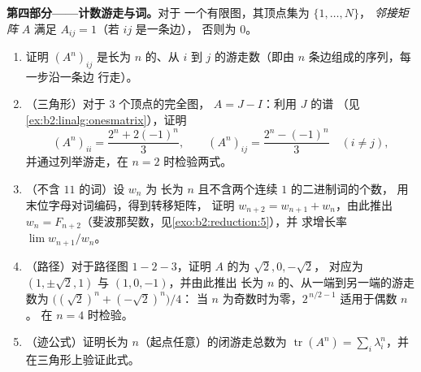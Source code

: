\begin{problem}
\medskip
\noindent\textbf{第四部分——计数游走与词。}对于
一个有限图，其顶点集为 $\{1, \dots, N\}$，
\emph{邻接矩阵} $A$ 满足 $A_{ij} = 1$（若 $ij$ 是一条边），
否则为 $0$。
\begin{enumerate}[resume]
  \item 证明 $(A^n)_{ij}$ 是长为
        $n$ 的、从 $i$ 到 $j$ 的游走数（即由 $n$ 条边组成的序列，每一步沿一条边
        行走）。
  \item （三角形）对于 $3$ 个顶点的完全图，
        $A = J - I$：利用 $J$ 的谱
        （见\cref{ex:b2:linalg:onesmatrix}），证明
        \[
        (A^n)_{ii} = \frac{2^n + 2(-1)^n}{3},
        \qquad
        (A^n)_{ij} = \frac{2^n - (-1)^n}{3} \quad (i \neq j),
        \]
        并通过列举游走，在 $n = 2$ 时检验两式。
  \item （不含 $11$ 的词）设 $w_n$ 为
        长为 $n$ 且不含两个连续 $1$ 的二进制词的个数，
        用末位字母对词编码，得到转移矩阵，
        证明 $w_{n+2} = w_{n+1} + w_n$，由此推出 $w_n =
        F_{n+2}$（斐波那契数，见\cref{exo:b2:reduction:5}），并
        求增长率 $\lim w_{n+1}/w_n$。
  \item （路径）对于路径图 $1 - 2 - 3$，证明
        $A$ 的为 $\sqrt2, 0, -\sqrt2$，
        对应为 $(1, \pm\sqrt2, 1)$ 与 $(1, 0, -1)$，并由此推出
        长为 $n$ 的、从一端到另一端的游走数为
        $\bigl((\sqrt2)^n + (-\sqrt2)^n\bigr)/4$：
        当 $n$ 为奇数时为零，$2^{\,n/2 - 1}$ 适用于偶数 $n$。
        在 $n = 4$ 时检验。
  \item （迹公式）证明长为
        $n$（起点任意）的闭游走总数为
        $\operatorname{tr}(A^n) = \sum_i \lambda_i^n$，并
        在三角形上验证此式。
\end{enumerate}


\end{problem}
